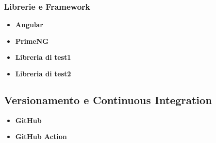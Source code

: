 \subsubsection{Librerie e Framework}

\begin{itemize}
	\item \textbf{Angular}
	\item \textbf{PrimeNG}
	\item \textbf{Libreria di test1}
	\item \textbf{Libreria di test2}
	
\end{itemize}







\subsection{Versionamento e Continuous Integration}

\begin{itemize}
	\item \textbf{GitHub}
	\item \textbf{GitHub Action}
\end{itemize}





